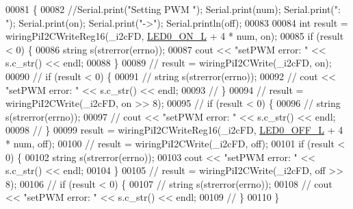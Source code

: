 \begin{DoxyCode}
00081                                                                            \{
00082     \textcolor{comment}{//Serial.print("Setting PWM "); Serial.print(num); Serial.print(": "); Serial.print(on);
       Serial.print("->"); Serial.println(off);}
00083 
00084     \textcolor{keywordtype}{int} result = wiringPiI2CWriteReg16(\_i2cFD, \hyperlink{Adafruit__PWMServoDriver_8h_a62f7dbcbb1fcf1084804f19a5b42248f}{LED0\_ON\_L} + 4 * num, on);
00085     \textcolor{keywordflow}{if} (result < 0) \{
00086         \textcolor{keywordtype}{string} s(strerror(errno));
00087         cout << \textcolor{stringliteral}{"setPWM error: "} << s.c\_str() << endl;
00088     \}
00089 \textcolor{comment}{//    result = wiringPiI2CWrite(\_i2cFD, on);}
00090 \textcolor{comment}{//    if (result < 0) \{}
00091 \textcolor{comment}{//        string s(strerror(errno));}
00092 \textcolor{comment}{//        cout << "setPWM error: " << s.c\_str() << endl;}
00093 \textcolor{comment}{//    \}}
00094 \textcolor{comment}{//    result = wiringPiI2CWrite(\_i2cFD, on >> 8);}
00095 \textcolor{comment}{//    if (result < 0) \{}
00096 \textcolor{comment}{//        string s(strerror(errno));}
00097 \textcolor{comment}{//        cout << "setPWM error: " << s.c\_str() << endl;}
00098 \textcolor{comment}{//    \}}
00099     result = wiringPiI2CWriteReg16(\_i2cFD, \hyperlink{Adafruit__PWMServoDriver_8h_a00e3f4b43121817be365b2f22e8bad84}{LED0\_OFF\_L} + 4 * num, off);
00100 \textcolor{comment}{//    result = wiringPiI2CWrite(\_i2cFD, off);}
00101     \textcolor{keywordflow}{if} (result < 0) \{
00102         \textcolor{keywordtype}{string} s(strerror(errno));
00103         cout << \textcolor{stringliteral}{"setPWM error: "} << s.c\_str() << endl;
00104     \}
00105 \textcolor{comment}{//    result = wiringPiI2CWrite(\_i2cFD, off >> 8);}
00106 \textcolor{comment}{//    if (result < 0) \{}
00107 \textcolor{comment}{//        string s(strerror(errno));}
00108 \textcolor{comment}{//        cout << "setPWM error: " << s.c\_str() << endl;}
00109 \textcolor{comment}{//    \}}
00110 \}
\end{DoxyCode}


